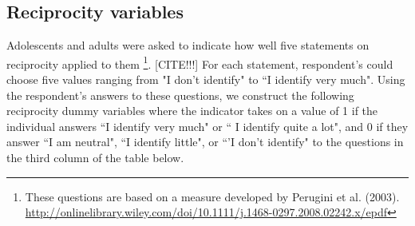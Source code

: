 \subsection{Reciprocity variables}
Adolescents and adults were asked to indicate how well five statements on reciprocity applied to them \footnote{ These questions are based on a measure developed by Perugini et al. (2003). \url{http://onlinelibrary.wiley.com/doi/10.1111/j.1468-0297.2008.02242.x/epdf}}. [CITE!!!] For each statement, respondent's could choose five values ranging from  "I don't identify" to ``I identify very much". Using the respondent's answers to these questions, we construct the following reciprocity dummy variables where the indicator takes on a value of 1 if the individual answers ``I identify very much" or `` I identify quite a lot", and 0 if they answer ``I am neutral", ``I identify little", or ``'I don't identify" to the questions in the third column of the table below.
\begin{table}[H]
\begin{center}
\end{center}
\end{table}

